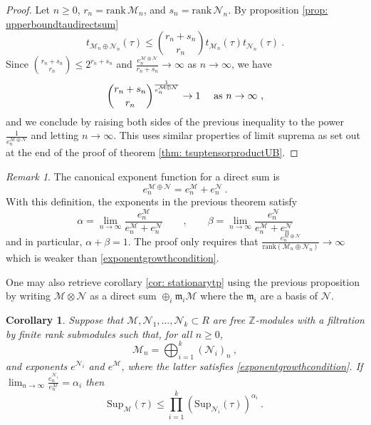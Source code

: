 \documentclass[a4paper,10pt]{amsart}
\newtheorem{cor}[thm]{Corollary}
\theoremstyle{definition}
\theoremstyle{remark}
\newtheorem{rem}[thm]{Remark}
\numberwithin{equation}{section}
\newcommand{\Z}{\mathbb Z}
\newcommand{\m}{\mathfrak{m}}
\newcommand{\ts}{\mathrm{Sup}}
\newcommand{\rank}{\mathrm{rank}}
\newcommand{\0}{\color{blue}{\mathsf{0}}}
\begin{document}
     \begin{proof} Let $n\geq 0$,  $r_n =  \rank \,   \mathcal{M}_n$,  and  $s_n =  \rank \,  \mathcal{N}_n$.       By proposition \ref{prop: upperboundtaudirectsum}
    \[  t_{\mathcal{M}_n \oplus \mathcal{N}_n} (\tau) \leq    \binom{r_n+s_n}{r_n}   t_{\mathcal{M}_n} (\tau) t_{\mathcal{N}_n} (\tau) \ . \]
  Since  $ \binom{r_n+s_n}{r_n} \leq 2^{r_n+s_n}$ and $\frac{e_n^{\mathcal{M}\oplus \mathcal{N} } }{ r_n+s_n }   \rightarrow  \infty$
    as $n\rightarrow \infty$,  we have 
  \[ \binom{r_n+s_n}{r_n}^{\frac{1}{e_n^{\mathcal{M} \oplus \mathcal{N}}}}\rightarrow 1\quad  \hbox{ as } n\rightarrow \infty\ , \]
 and we conclude by raising both sides of the previous inequality to the power $\frac{1}{e_n^{\mathcal{M} \oplus \mathcal{N}}}$ and letting $n\rightarrow \infty$. This uses similar properties of limit suprema as set out at the end of the proof of theorem \ref{thm: tsuptensorproductUB}. 
        \end{proof}
     
     \begin{rem}  \label{rem: exponentdirectsum} The canonical exponent function for a direct sum is
     \[ e_n^{\mathcal{M} \oplus \mathcal{N}} = e_n^{\mathcal{M}} +  e_n^{\mathcal{N}}\ . \]
 With this definition, the exponents in the previous theorem satisfy 
      \[ \alpha  =  \lim_{n\rightarrow \infty}   \frac{e_n^{\mathcal{M}}}{ e_n^{\mathcal{M}} +  e_n^{\mathcal{N}}} \qquad , \qquad   \beta  =  \lim_{n\rightarrow \infty}   \frac{e_n^{\mathcal{N}}}{ e_n^{\mathcal{M}} +  e_n^{\mathcal{N}}}  \]
     and in particular, $\alpha + \beta =1$.    The proof only requires that
     $  \frac{e_n^{\mathcal{M}\oplus \mathcal{N} } }{ \rank(\mathcal{M}_n \oplus \mathcal{N}_n) }   \rightarrow \infty$ 
      which is weaker than    \eqref{exponentgrowthcondition}.
         \end{rem} 
         
         
         
         
   
   One may also retrieve  corollary \ref{cor: stationarytp} using the previous  proposition by writing $\mathcal{M} \otimes \mathcal{N}$ as a direct sum 
   $\oplus_i \m_i \mathcal{M}$ where the $\m_i$ are a basis  of $\mathcal{N}$.  
    
   
   
   \begin{cor}  \label{cor: directsums} Suppose that  $\mathcal{M}, \mathcal{N}_1,\ldots, \mathcal{N}_k \subset R$ are  free $\Z$-modules with a  filtration by finite rank submodules such that, for all  $n \geq 0$, 
   \[  \mathcal{M}_n = \bigoplus_{i=1}^k   (\mathcal{N}_i)_n\ ,  \]
and exponents $e^{\mathcal{N}_i}$ and  $e^{\mathcal{M}}$, where the latter satisfies \eqref{exponentgrowthcondition}. 
      If 
    $ \lim_{n\rightarrow \infty} \frac{ e_n^{\mathcal{N}_i} }{ e_n^{\mathcal{M}  } } =  \alpha_i
    $
    then 
   \[ \ts_{\mathcal{M} }  (\tau) \leq \prod_{i=1}^k  \left(\ts_{\mathcal{N}_i}(\tau) \right)^{\alpha_i}   \ . \]
     \end{cor} 
   
\end{document}
